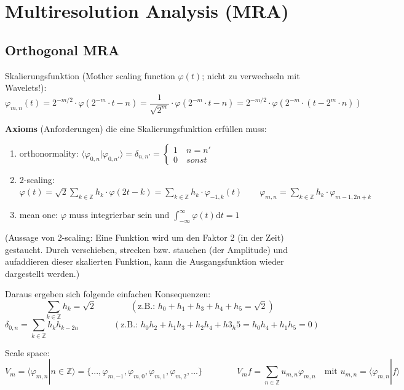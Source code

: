 \section{Multiresolution Analysis (MRA)}

\subsection{Orthogonal MRA}
Skalierungsfunktion (Mother scaling function $\varphi(t)$; nicht zu verwechseln mit Wavelets!): 
\[
	\varphi_{m,n}(t)=2^{-m/2} \cdot \varphi(2^{-m}\cdot t - n) = \frac{1}{\sqrt{2^{m}}} \cdot \varphi(2^{-m}\cdot t -n) = 2^{-m/2} \cdot \varphi(2^{-m}\cdot (t - 2^{m}\cdot n))
\]

\textbf{Axioms} (Anforderungen) die eine Skalierungsfunktion erfüllen muss:
\begin{enumerate}
	\item orthonormality: $ \langle \varphi_{0,n}|\varphi_{0,n'} \rangle = \delta_{n,n'} =  \begin{cases} 1 \quad n=n'\\ 0 \quad sonst  \end{cases}  $
	\item 2-scaling: $ \varphi(t) = \sqrt{2} \sum_{k \in \mathbb{Z}} h_k \cdot \varphi(2t-k) = \sum_{k \in \mathbb{Z}} h_k \cdot \varphi_{-1,k}(t) \qquad \varphi_{m,n}=\sum_{k \in \mathbb{Z}} h_k \cdot \varphi_{m-1,2n+k} $
	\item mean one: $ \varphi \text{ muss integrierbar sein und } \int_{-\infty}^{\infty}\varphi(t) \mathrm{d}t = 1 $
\end{enumerate}

(Aussage von 2-scaling: Eine Funktion wird um den Faktor 2 (in der Zeit) gestaucht. Durch verschieben, strecken bzw. stauchen (der Amplitude) und aufaddieren dieser skalierten Funktion, kann die  Ausgangsfunktion wieder dargestellt werden.)

Daraus ergeben sich folgende einfachen Konsequenzen:
\[ 
	\sum_{k \in \mathbb{Z}} h_k = \sqrt{2} \qquad \qquad (\text{z.B.: } h_0 + h_1 + h_3 + h_4 + h_5 = \sqrt{2})
\]
\[
	\delta_{0,n} = \sum_{k \in \mathbb{Z}} h_k h_{k-2n} \qquad \qquad (\text{z.B.: } h_0h_2 + h_1h_3 + h_2h_4 + h3_h5 = h_0h_4+h_1h_5 = 0 )
\]

Scale space: 
\[
	V_m = \langle \varphi_{m,n}|n \in \mathbb{Z}  \rangle = \{ ...,\varphi_{m,-1},\varphi_{m,0}, \varphi_{m,1}, \varphi_{m,2},... \}
	\qquad \qquad
	V_mf = \sum_{n \in \mathbb{Z}} u_{m,n}\varphi_{m,n} \quad \text{mit } u_{m,n}=\langle \varphi_{m,n}|f \rangle
\]

